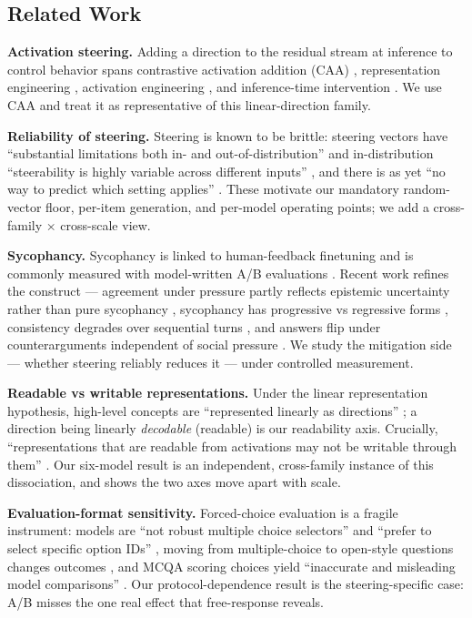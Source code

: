 \documentclass[11pt]{article}
\begin{document}
\subsection{Related Work}\label{related-work}

\textbf{Activation steering.} Adding a direction to the residual stream at inference to control behavior
spans contrastive activation addition (CAA) \citep{panickssery2024caa}, representation engineering
\citep{zou2023repe}, activation engineering \citep{turner2023actadd}, and inference-time intervention
\citep{li2023iti}. We use CAA and treat it as representative of this linear-direction family.

\textbf{Reliability of steering.} Steering is known to be brittle: steering vectors have ``substantial
limitations both in- and out-of-distribution'' and in-distribution ``steerability is highly variable
across different inputs'' \citep{tan2024steering}, and there is as yet ``no way to predict which
setting applies'' \citep{billa2026predicting}. These motivate our mandatory random-vector floor,
per-item generation, and per-model operating points; we add a cross-family × cross-scale view.

\textbf{Sycophancy.} Sycophancy is linked to human-feedback finetuning \citep{sharma2024sycophancy} and is
commonly measured with model-written A/B evaluations \citep{perez2022discovering}. Recent work
refines the construct --- agreement under pressure partly reflects epistemic uncertainty rather than
pure sycophancy \citep{guo2026conformity}, sycophancy has progressive vs regressive forms
\citep{syceval2025}, consistency degrades over sequential turns \citep{li2025firmfickle}, and answers
flip under counterarguments independent of social pressure \citep{nikeghbal2026whoflips}. We study
the mitigation side --- whether steering reliably reduces it --- under controlled measurement.

\textbf{Readable vs writable representations.} Under the linear representation hypothesis, high-level
concepts are ``represented linearly as directions'' \citep{park2023linear}; a direction being linearly
\emph{decodable} (readable) is our readability axis. Crucially, ``representations that are readable from
activations may not be writable through them'' \citep{buchan2026dualstance}. Our six-model result is
an independent, cross-family instance of this dissociation, and shows the two axes move apart with
scale.

\textbf{Evaluation-format sensitivity.} Forced-choice evaluation is a fragile instrument: models are ``not
robust multiple choice selectors'' and ``prefer to select specific option IDs'' \citep{zheng2023mcqselectors},
moving from multiple-choice to open-style questions changes outcomes \citep{myrzakhan2024openllm},
and MCQA scoring choices yield ``inaccurate and misleading model comparisons'' \citep{wang2025rightanswer}.
Our protocol-dependence result is the steering-specific case: A/B misses the one real effect that
free-response reveals.
\end{document}
